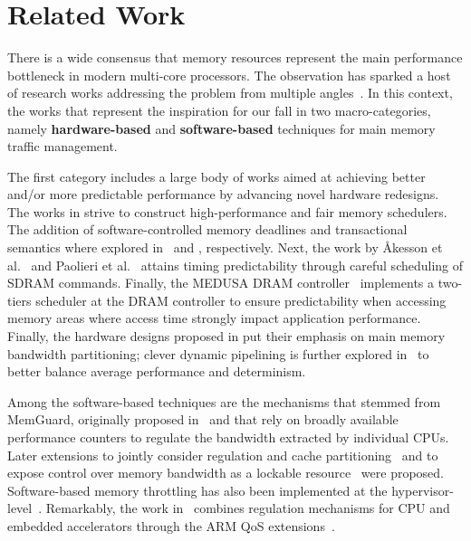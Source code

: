 \section{Related Work}\label{sec:relwork}
There is a wide consensus that memory resources represent the main
performance bottleneck in modern multi-core processors. The
observation has sparked a host of research works addressing the
problem from multiple angles~\cite{temp_reg_survey}. In this context,
the works that represent the inspiration for our \schim fall in two
macro-categories, namely \textbf{hardware-based} and
\textbf{software-based} techniques for main memory traffic management.

The first category includes a large body of works aimed at achieving
better and/or more predictable performance by advancing novel hardware
redesigns. The works in \cite{mutlu2007stall, mutlu2008parallelism,
  nesbit2006fair} strive to construct high-performance and fair memory
schedulers. The addition of software-controlled memory deadlines and
transactional semantics where explored in~\cite{usui2016dash} and
\cite{ferri2011soc}, respectively. Next, the work by Åkesson et
al.~\cite{akesson2007predator, akesson2010predictable} and Paolieri et
al.~\cite{paolieri2009analyzable} attains timing predictability
through careful scheduling of SDRAM commands. Finally, the MEDUSA DRAM
controller~\cite{valsan2015medusa, detmem2018} implements a two-tiers
scheduler at the DRAM controller to ensure predictability when
accessing memory areas where access time strongly impact application
performance. Finally, the hardware designs proposed in
\cite{zhou2016mitts, rafique2007effective, Farshchi2020BRUBR} put
their emphasis on main memory bandwidth partitioning; clever dynamic
pipelining is further explored in~\cite{drambulism2020rtas} to better
balance average performance and determinism.

Among the software-based techniques are the mechanisms that stemmed
from MemGuard, originally proposed in~\cite{memguard2013} and that
rely on broadly available performance counters to regulate the
bandwidth extracted by individual CPUs. Later extensions to jointly
consider regulation and cache partitioning~\cite{holistic2019rtas} and
to expose control over memory bandwidth as a lockable
resource~\cite{bwlockyun2017} were proposed. Software-based memory
throttling has also been implemented at the
hypervisor-level~\cite{xvisor2018, ewarp2020rtss}. Remarkably, the
work in~\cite{ewarp2020rtss} combines regulation mechanisms for CPU
and embedded accelerators through the ARM QoS
extensions~\cite{qos-400}.

